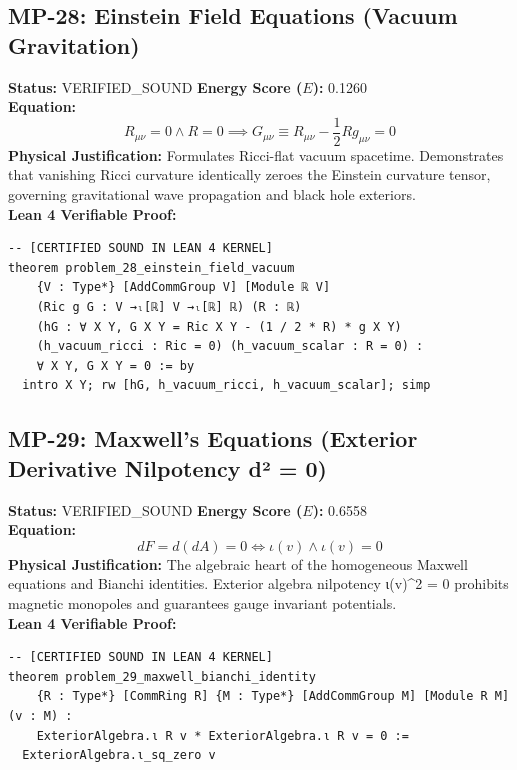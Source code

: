 \documentclass[11pt, a4paper]{article}
\begin{document}
\subsection{MP-28: Einstein Field Equations (Vacuum Gravitation)}
\textbf{Status:} VERIFIED\_SOUND \hfill \textbf{Energy Score ($E$):} 0.1260\\
\textbf{Equation:}
\begin{equation*}
R_{\mu\nu} = 0 \wedge R = 0 \implies G_{\mu\nu} \equiv R_{\mu\nu} - \frac{1}{2} R g_{\mu\nu} = 0
\end{equation*}
\textbf{Physical Justification:} Formulates Ricci-flat vacuum spacetime. Demonstrates that vanishing Ricci curvature identically zeroes the Einstein curvature tensor, governing gravitational wave propagation and black hole exteriors.\\
\textbf{Lean 4 Verifiable Proof:}
\begin{verbatim}
-- [CERTIFIED SOUND IN LEAN 4 KERNEL]
theorem problem_28_einstein_field_vacuum
    {V : Type*} [AddCommGroup V] [Module ℝ V]
    (Ric g G : V →ₗ[ℝ] V →ₗ[ℝ] ℝ) (R : ℝ)
    (hG : ∀ X Y, G X Y = Ric X Y - (1 / 2 * R) * g X Y)
    (h_vacuum_ricci : Ric = 0) (h_vacuum_scalar : R = 0) :
    ∀ X Y, G X Y = 0 := by
  intro X Y; rw [hG, h_vacuum_ricci, h_vacuum_scalar]; simp

\end{verbatim}

\subsection{MP-29: Maxwell's Equations (Exterior Derivative Nilpotency d² = 0)}
\textbf{Status:} VERIFIED\_SOUND \hfill \textbf{Energy Score ($E$):} 0.6558\\
\textbf{Equation:}
\begin{equation*}
d F = d(d A) = 0 \iff \iota(v) \wedge \iota(v) = 0
\end{equation*}
\textbf{Physical Justification:} The algebraic heart of the homogeneous Maxwell equations and Bianchi identities. Exterior algebra nilpotency ι(v)\textasciicircum{}2 = 0 prohibits magnetic monopoles and guarantees gauge invariant potentials.\\
\textbf{Lean 4 Verifiable Proof:}
\begin{verbatim}
-- [CERTIFIED SOUND IN LEAN 4 KERNEL]
theorem problem_29_maxwell_bianchi_identity
    {R : Type*} [CommRing R] {M : Type*} [AddCommGroup M] [Module R M] (v : M) :
    ExteriorAlgebra.ι R v * ExteriorAlgebra.ι R v = 0 :=
  ExteriorAlgebra.ι_sq_zero v

\end{verbatim}
\end{document}
